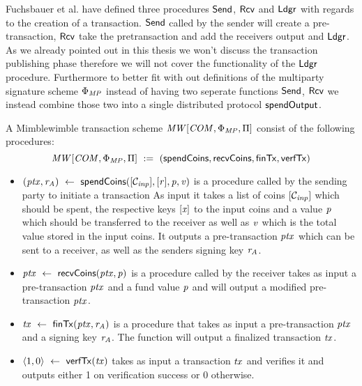 Fuchsbauer et al. have defined three procedures $\mathsf{Send}$, $\mathsf{Rcv}$ and $\mathsf{Ldgr}$ with regards to the creation of a transaction. $\mathsf{Send}$ called by the sender
will create a pre-transaction, $\mathsf{Rcv}$ take the pretransaction and add the receivers output and $\mathsf{Ldgr}$. As we already pointed out in this thesis we won't discuss the transaction
publishing phase therefore we will not cover the functionality of the $\mathsf{Ldgr}$ procedure. Furthermore to better fit with out definitions of the multiparty signature scheme $\Phi_{\mathit{MP}}$ instead
of having two seperate functions $\mathsf{Send}$, $\mathsf{Rcv}$ we instead combine those two into a single distributed protocol $\mathsf{spendOutput}$.

\begin{definition}
    \label{def:tx}
    A Mimblewimble transaction scheme $\mathit{MW}[\mathit{COM},\Phi_{\mathit{MP}},\Pi]$ consist of the following procedures:
    \[ \mathit{MW}[\mathit{COM},\Phi_{\mathit{MP}},\Pi] ~:=~ ( \mathsf{spendCoins},\mathsf{recvCoins},\mathsf{finTx},\mathsf{verfTx} ) \]
    \begin{itemize}
        \item $(\mathit{ptx}, \mathit{r}_{\mathit{A}}) ~\leftarrow~ \mathsf{spendCoins}([\mathcal{C}_{\mathit{inp}}],[\mathit{r}],\mathit{p},\mathit{v})$ is a procedure called by the sending party to initiate a transaction
        As input it takes a list of coins $[\mathcal{C}_{\mathit{inp}}]$ which should be spent, the respective keys $[\mathit{x}]$ to the input coins and a value $\mathit{p}$ which should be
        transferred to the receiver as well as $\mathit{v}$ which is the total value stored in the input coins. It outputs a pre-transaction $\mathit{ptx}$ which can be sent to a receiver, as well as the senders signing key $\mathit{r}_{\mathit{A}}$.
        \item $\mathit{ptx} ~\leftarrow~ \mathsf{recvCoins}(\mathit{ptx},\mathit{p})$ is a procedure called by the receiver takes as input a pre-transaction $\mathit{ptx}$ and a fund value
        $\mathit{p}$ and will output a modified pre-transaction $\mathit{ptx}$.
        \item $\mathit{tx} ~\leftarrow~ \mathsf{finTx}(\mathit{ptx},\mathit{r}_{\mathit{A}})$ is a procedure that takes as input a pre-transaction $\mathit{ptx}$ and a signing key
        $\mathit{r}_{\mathit{A}}$. The function will output a finalized transaction $\mathit{tx}$.
        \item $\langle1,0\rangle ~\leftarrow~ \mathsf{verfTx}(\mathit{tx})$ takes as input a transaction $\mathit{tx}$ and verifies it and outputs either 1 on verification success or 0 otherwise.
    \end{itemize}
\end{definition}

